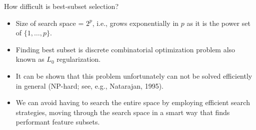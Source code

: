 \documentclass[11pt,compress,t,notes=noshow, xcolor=table]{beamer}
\begin{document}
  
 \begin{vbframe}{How difficult is best-subset selection?}

    \begin{itemize}
    \setlength{\itemsep}{1.2em}
      \item Size of search space = $2^p$, i.e., grows exponentially in $p$ as it is the power set of $\{1,\ldots,p\}$.
      \item Finding best subset is discrete combinatorial optimization problem also known as $L_0$ regularization.
     \item It can be shown that this problem unfortunately can not be solved efficiently in general (NP-hard; see, e.g., Natarajan, 1995).
     \item We can avoid having to search the entire space by employing efficient search strategies, moving through the search space in a smart way that finds performant feature subsets.
    \end{itemize}
  \end{vbframe}


  \endlecture
\end{document}
